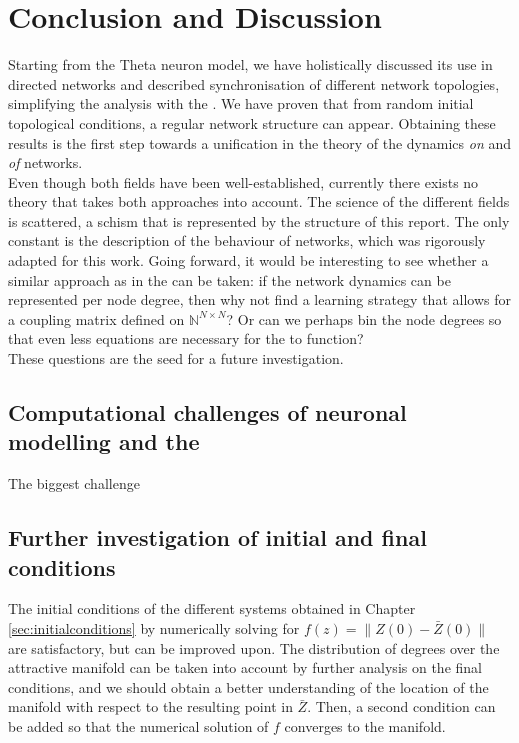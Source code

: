 \newpage
\section{Conclusion and Discussion} \label{sec:ConclusionAndDiscussion}
Starting from the Theta neuron model, we have holistically discussed its use in directed networks and described synchronisation of different network topologies, simplifying the analysis with the \MFR. We have proven that from random initial topological conditions, a regular network structure can appear. Obtaining these results is the first step towards a unification in the theory of the dynamics \textsl{on} and \textsl{of} networks. \\

Even though both fields have been well-established, currently there exists no theory that takes both approaches into account. The science of the different fields is scattered, a schism that is represented by the structure of this report. The only constant is the description of the behaviour of networks, which was rigorously adapted for this work. Going forward, it would be interesting to see whether a similar approach as in the \MFR can be taken: if the network dynamics can be represented per node degree, then why not find a learning strategy that allows for a coupling matrix defined on $\mathbb{N}^{N \times N}$? Or can we perhaps bin the node degrees so that even less equations are necessary for the \MFR to function? \\

These questions are the seed for a future investigation.

\subsection{Computational challenges of neuronal modelling and the \MFR}
The biggest challenge 

\subsection{Further investigation of initial and final conditions}
The initial conditions of the different systems obtained in Chapter \ref{sec:initialconditions} by numerically solving for $f(z) = \| Z(0) - \bar{Z}(0) \|$ are satisfactory, but can be improved upon. The distribution of degrees over the attractive manifold can be taken into account by further analysis on the final conditions, and we should obtain a better understanding of the location of the manifold with respect to the resulting point in $\bar{Z}$. Then, a second condition can be added so that the numerical solution of $f$ converges to the manifold. 

